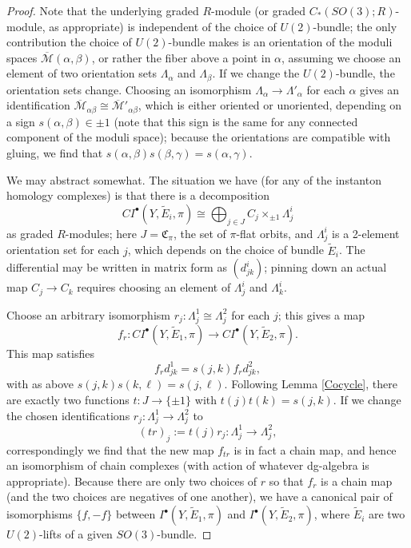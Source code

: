 \documentclass{memo-l}
\theoremstyle{definition}
\theoremstyle{remark}
\numberwithin{section}{chapter}
\numberwithin{equation}{chapter}
\begin{document}
\begin{proof}Note that the underlying graded $R$-module (or graded $C_*(SO(3);R)$-module, as appropriate) is independent of the choice of $U(2)$-bundle; the only contribution the choice of $U(2)$-bundle makes is an orientation of the moduli spaces $\overline{\mathcal M}(\alpha, \beta)$, or rather the fiber above a point in $\alpha$, assuming we choose an element of two orientation sets $\Lambda_\alpha$ and $\Lambda_\beta$. If we change the $U(2)$-bundle, the orientation sets change. Choosing an isomorphism $\Lambda_\alpha \to \Lambda'_\alpha$ for each $\alpha$ gives an identification $\overline{\mathcal M}_{\alpha \beta} \cong \overline{\mathcal M}'_{\alpha \beta}$, which is either oriented or unoriented, depending on a sign $s(\alpha, \beta) \in \pm 1$ (note that this sign is the same for any connected component of the moduli space); because the orientations are compatible with gluing, we find that $s(\alpha, \beta) s(\beta, \gamma) = s(\alpha, \gamma)$. 

We may abstract somewhat. The situation we have (for any of the instanton homology complexes) is that there is a decomposition 
$$CI^\bullet(Y, \tilde E_i, \pi) \cong \bigoplus_{j \in J} C_j \times_{\pm 1} \Lambda^i_j$$ as graded $R$-modules; here $J = \mathfrak C_\pi$, the set of $\pi$-flat orbits, and $\Lambda^i_j$ is a 2-element orientation set for each $j$, which depends on the choice of bundle $\tilde E_i$. The differential may be written in matrix form as $(d^i_{jk})$; pinning down an actual map $C_j \to C_k$ requires choosing an element of $\Lambda^i_j$ and $\Lambda^i_k$.

Choose an arbitrary isomorphism $r_j: \Lambda^1_j \cong \Lambda^2_j$ for each $j$; this gives a map 
$$f_r: CI^\bullet(Y, \tilde E_1, \pi) \to CI^\bullet(Y, \tilde E_2, \pi).$$
This map satisfies 
$$f_r d^1_{jk} = s(j,k)f_r d^2_{jk},$$
with as above $s(j,k) s(k,\ell) = s(j,\ell).$ Following Lemma \ref{Cocycle}, there are exactly two functions $t: J \to \{\pm 1\}$ with $t(j)t(k) = s(j,k).$ If we change the chosen identifications $r_j: \Lambda^1_j \to \Lambda^2_j$ to 
$$(tr)_j := t(j)r_j: \Lambda^1_j \to \Lambda^2_j,$$ 
correspondingly we find that the new map $f_{tr}$ is in fact a chain map, and hence an isomorphism of chain complexes (with action of whatever dg-algebra is appropriate). Because there are only two choices of $r$ so that $f_r$ is a chain map (and the two choices are negatives of one another), we have a canonical pair of isomorphisms $\{f, -f\}$ between $I^\bullet(Y,\tilde E_1, \pi)$ and $I^\bullet(Y, \tilde E_2, \pi)$, where $\tilde E_i$ are two $U(2)$-lifts of a given $SO(3)$-bundle.
\end{proof}
\end{document}

